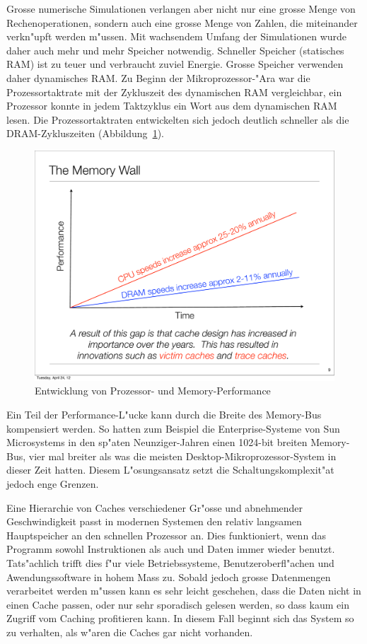 Grosse numerische Simulationen verlangen aber nicht nur eine grosse
Menge von Rechenoperationen, sondern auch eine grosse Menge von
Zahlen, die miteinander verkn"upft werden m"ussen.
Mit wachsendem Umfang der Simulationen wurde daher auch mehr
und mehr Speicher notwendig. Schneller Speicher (statisches RAM) ist
zu teuer und verbraucht zuviel Energie. Grosse Speicher verwenden
daher dynamisches RAM. Zu Beginn der Mikroprozessor-"Ara war
die Prozessortaktrate mit der Zykluszeit des dynamischen RAM
vergleichbar, ein Prozessor konnte in jedem Taktzyklus 
ein Wort aus dem dynamischen RAM lesen. Die Prozessortaktraten
entwickelten sich jedoch deutlich schneller als die DRAM-Zykluszeiten
(Abbildung~\ref{memorywall}).
\begin{figure}
\begin{center}
\includegraphics[width=0.6\hsize]{images/memorywall.pdf}
\end{center}
\caption{Entwicklung von Prozessor- und Memory-Performance
\label{memorywall}}
\end{figure}

Ein Teil der Performance-L"ucke kann durch
die Breite des Memory-Bus kompensiert werden. So hatten zum Beispiel die
Enterprise-Systeme von Sun Microsystems in den sp"aten Neunziger-Jahren
einen 1024-bit breiten Memory-Bus, vier mal breiter als was die meisten
Desktop-Mikroprozessor-System in dieser Zeit hatten.
Diesem L"osungsansatz setzt die Schaltungskomplexit"at jedoch enge Grenzen.

Eine Hierarchie von Caches verschiedener Gr"osse und abnehmender
Geschwindigkeit passt in modernen Systemen den relativ langsamen
Hauptspeicher an den schnellen Prozessor an. Dies funktioniert,
wenn  das Programm sowohl Instruktionen als auch und Daten immer wieder benutzt.
Tats"achlich trifft dies f"ur viele Betriebssysteme, Benutzeroberfl"achen
und Awendungssoftware in hohem Mass zu.
Sobald jedoch grosse Datenmengen verarbeitet werden m"ussen kann
es sehr leicht geschehen, dass die Daten nicht in einen Cache passen,
oder nur sehr sporadisch gelesen werden, so dass kaum ein Zugriff
vom Caching profitieren kann.
In diesem Fall beginnt sich das System so zu verhalten, als w"aren die
Caches gar nicht vorhanden.

